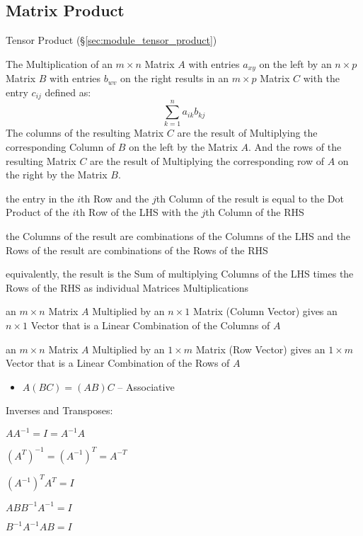 \subsection{Matrix Product}\label{sec:matrix_product}

\fist Tensor Product (\S\ref{sec:module_tensor_product})

The Multiplication of an $m \times n$ Matrix $A$ with entries $a_{xy}$
on the left by an $n \times p$ Matrix $B$ with entries $b_{wv}$ on the
right results in an $m \times p$ Matrix $C$ with the entry $c_{ij}$
defined as:
\[
  \sum_{k=1}^n a_{ik} b_{kj}
\]
The columns of the resulting Matrix $C$ are the result of Multiplying
the corresponding Column of $B$ on the left by the Matrix $A$. And the
rows of the resulting Matrix $C$ are the result of Multiplying the
corresponding row of $A$ on the right by the Matrix $B$.

the entry in the $i$th Row and the $j$th Column of the result is equal to the
Dot Product of the $i$th Row of the LHS with the $j$th Column of the RHS

the Columns of the result are combinations of the Columns of the LHS and the
Rows of the result are combinations of the Rows of the RHS

equivalently, the result is the Sum of multiplying Columns of the LHS times the
Rows of the RHS as individual Matrices Multiplications

an $m \times n$ Matrix $A$ Multiplied by an $n \times 1$ Matrix (Column Vector)
gives an $n \times 1$ Vector that is a Linear Combination of the Columns of $A$

an $m \times n$ Matrix $A$ Multiplied by an $1 \times m$ Matrix (Row Vector)
gives an $1 \times m$ Vector that is a Linear Combination of the Rows of $A$

\begin{itemize}
  \item $A(BC) = (AB)C$ -- Associative
\end{itemize}

Inverses and Transposes:

$AA^{-1} = I = A^{-1}A$

$(A^T)^{-1} = (A^{-1})^T = A^{-T}$

$(A^{-1})^T A^T = I$

$ABB^{-1}A^{-1} = I$

$B^{-1}A^{-1}AB = I$

